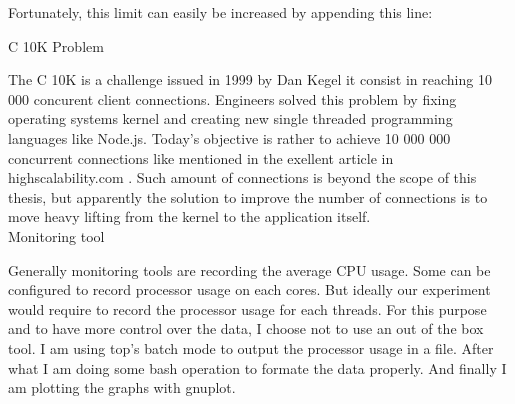 Fortunately, this limit can easily be increased by appending this line:
\begin{comment}
ubuntu soft nofile number_of_file in
/etc/security/limits.conf.\\
\end{comment}

C 10K Problem

The C 10K is a challenge issued in 1999 by Dan Kegel it consist in reaching 10
000 concurent client connections. Engineers solved this problem by fixing
operating systems kernel and creating new single threaded programming languages
like Node.js. Today's objective is rather to achieve 10 000 000 concurrent
connections like mentioned in the exellent article in highscalability.com
\citep{Reference39}. Such amount of connections is beyond the scope of this
thesis, but apparently the solution to improve the number of connections is to
move heavy lifting from the kernel to the application itself.\\

Monitoring tool

Generally monitoring tools are recording the average CPU usage. Some can be
configured to record  processor usage on each cores. But ideally our experiment
would require to record the processor usage for each threads.  For this purpose
and to have more control over the data, I choose not to use an out of the box
tool. I am using top's batch mode to output the processor usage in a file.
After what I am doing some bash operation to formate the data properly. And
finally I am plotting the graphs with gnuplot.\\

